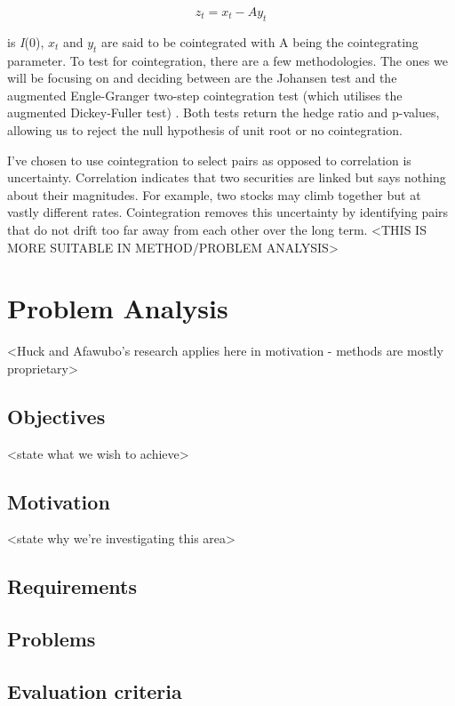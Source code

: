 \documentclass{UoYCSproject}
\begin{document}
\[z_t = x_t - Ay_t\]

is \emph{I}(0), $x_t$ and $y_t$ are said to be cointegrated with A being the cointegrating parameter. To test for cointegration, there are a few methodologies. The ones we will be focusing on and deciding between are the Johansen test \parencite{johansen} and the augmented Engle-Granger two-step cointegration test (which utilises the augmented Dickey-Fuller test) \parencite{adf}. Both tests return the hedge ratio and p-values, allowing us to reject the null hypothesis of unit root or no cointegration.

I've chosen to use cointegration to select pairs as opposed to correlation is uncertainty. Correlation indicates that two securities are linked but says nothing about their magnitudes. For example, two stocks may climb together but at vastly different rates. Cointegration removes this uncertainty by identifying pairs that do not drift too far away from each other over the long term. <THIS IS MORE SUITABLE IN METHOD/PROBLEM ANALYSIS>

\chapter{Problem Analysis}
\label{cha:Problem Analysis}

<Huck and Afawubo's research applies here in motivation - methods are mostly proprietary>

\section{Objectives}

<state what we wish to achieve>

\section{Motivation}

<state why we're investigating this area>

\section{Requirements}



\section{Problems}

\section{Evaluation criteria}
\end{document}
